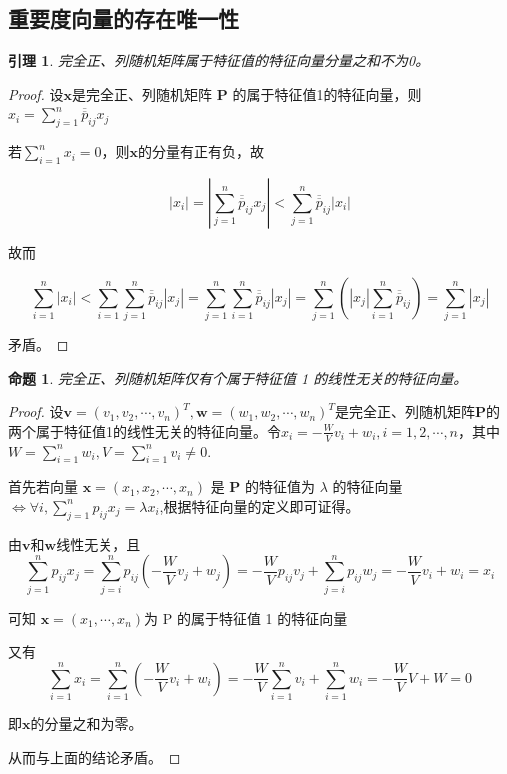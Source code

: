 \documentclass[12pt, a4paper, oneside]{ctexbook}
\newtheorem{lemma}[theorem]{引理}
\newtheorem{proposition}[theorem]{命题}
\begin{document}
\subsection{重要度向量的存在唯一性}
\begin{lemma}
    完全正、列随机矩阵属于特征值的特征向量分量之和不为0。
\end{lemma}
\begin{proof}
    设$\mathbf{x}$是完全正、列随机矩阵 $\mathbf{P}$ 的属于特征值1的特征向量，则$x_i=\sum\limits_{j=1}^n\overline{\overline{p}}_{ij}x_j$
        
        若$\sum\limits_{i=1}^nx_i=0$，则$\mathbf{x}$的分量有正有负，故
        
        $$|x_i|=|\sum\limits_{j=1}^n\overline{\overline{p}}_{ij}x_j|<\sum\limits_{j=1}^n\overline{\overline{p}}_{ij}|x_i|$$

        故而

        $$\sum\limits_{i=1}^n|x_i|<\sum\limits_{i=1}^n\sum\limits_{j=1}^n\overline{\overline{p}}_{ij}|x_j|=\sum\limits_{j=1}^n\sum\limits_{i=1}^n\overline{\overline{p}}_{ij}|x_j|=\sum\limits_{j=1}^n(|x_j|\sum\limits_{i=1}^n\overline{\overline{p}}_{ij})=\sum\limits_{j=1}^n|x_j|$$

        矛盾。
\end{proof}
\begin{proposition}
    完全正、列随机矩阵仅有个属于特征值 1 的线性无关的特征向量。
\end{proposition}
\begin{proof}
    
    设$\mathbf{v}=(v_1,v_2,\cdots,v_n)^T, \mathbf{w}=(w_1,w_2,\cdots,w_n)^T$是完全正、列随机矩阵$\mathbf{P}$的两个属于特征值1的线性无关的特征向量。令$x_i = -\frac{W}{V}v_i+w_i, i = 1,2,\cdots,n$，其中$W=\sum_{i=1}^nw_i, V=\sum_{i=1}^nv_i\neq 0$.
    
    首先若向量 $\mathbf{x} = (x_1,x_2,\cdots,x_n)$ 是 $\mathbf{P}$ 的特征值为 $\lambda$ 的特征向量 $\Leftrightarrow \forall i, \sum\limits_{j=1}^n p_{ij}x_j=\lambda x_i$,根据特征向量的定义即可证得。

    由$\mathbf{v}$和$\mathbf{w}$线性无关，且
    $$\sum\limits_{j=1}^n p_{ij}x_j=\sum\limits_{j=i}^n p_{ij}(-\frac{W}{V}v_j+w_j)=-\frac{W}{V} p_{ij}v_j+\sum\limits_{j=i}^n p_{ij}w_j=-\frac{W}{V}v_i+w_i=x_i$$

    可知 $\mathbf{x}=(x_1,\cdots,x_n)$为 P 的属于特征值 1 的特征向量
   
    又有
    $$\sum\limits_{i=1}^nx_i = \sum\limits_{i=1}^n(-\frac{W}{V}v_i+w_i) = -\frac{W}{V}\sum\limits_{i=1}^nv_i+\sum\limits_{i=1}^nw_i = -\frac{W}{V}V+W = 0$$

    即$\mathbf{x}$的分量之和为零。

    从而与上面的结论矛盾。
\end{proof}
\end{document}
